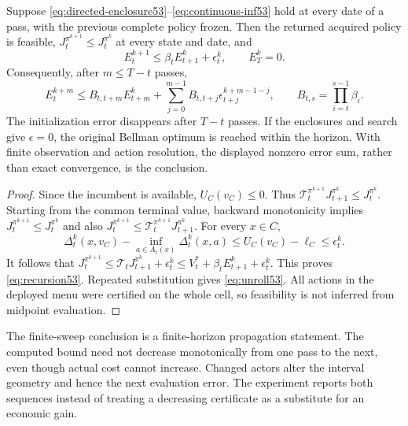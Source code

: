 \begin{theorem}\label{thm:directed53}
Suppose \eqref{eq:directed-enclosure53}--\eqref{eq:continuous-inf53} hold at every date of a pass, with the previous complete policy frozen. Then the returned acquired policy is feasible, $J_t^{\pi^{k+1}}\le J_t^{\pi^k}$ at every state and date, and
\begin{equation}\label{eq:recursion53}
 E_t^{k+1}\le\beta_tE_{t+1}^k+\epsilon_t^k,\qquad E_T^k=0.
\end{equation}
Consequently, after $m\le T-t$ passes,
\begin{equation}\label{eq:unroll53}
 E_t^{k+m}\le B_{t,t+m}E_{t+m}^k+
 \sum_{j=0}^{m-1}B_{t,t+j}\epsilon_{t+j}^{k+m-1-j},
 \qquad B_{t,s}=\prod_{i=t}^{s-1}\beta_i.
\end{equation}
The initialization error disappears after $T-t$ passes. If the enclosures and search give $\epsilon=0$, the original Bellman optimum is reached within the horizon. With finite observation and action resolution, the displayed nonzero error sum, rather than exact convergence, is the conclusion.
\end{theorem}
\begin{proof}
Since the incumbent is available, $U_C(v_C)\le0$. Thus $\mathcal T_t^{\pi^{k+1}}J_{t+1}^{\pi^k}\le J_t^{\pi^k}$. Starting from the common terminal value, backward monotonicity implies $J_t^{\pi^{k+1}}\le J_t^{\pi^k}$ and also $J_t^{\pi^{k+1}}\le\mathcal T_t^{\pi^{k+1}}J_{t+1}^{\pi^k}$. For every $x\in C$,
\[
 \Delta_t^k(x,v_C)-\inf_{a\in A_t(x)}\Delta_t^k(x,a)
 \le U_C(v_C)-\ell_C\le\epsilon_t^k.
\]
It follows that $J_t^{\pi^{k+1}}\le\mathcal T_tJ_{t+1}^{\pi^k}+\epsilon_t^k\le V_t^*+\beta_tE_{t+1}^k+\epsilon_t^k$. This proves \eqref{eq:recursion53}. Repeated substitution gives \eqref{eq:unroll53}. All actions in the deployed menu were certified on the whole cell, so feasibility is not inferred from midpoint evaluation.
\end{proof}

The finite-sweep conclusion is a finite-horizon propagation statement. The computed bound need not decrease monotonically from one pass to the next, even though actual cost cannot increase. Changed actors alter the interval geometry and hence the next evaluation error. The experiment reports both sequences instead of treating a decreasing certificate as a substitute for an economic gain.

